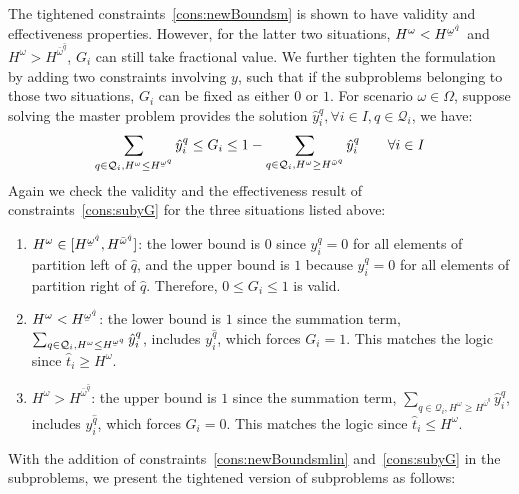 \documentclass[11pt]{article}
\renewcommand{\underbar}{\underaccent{\bar}}
\begin{document}
	The tightened constraints~\eqref{cons:newBoundsm} is shown to have validity and effectiveness properties. However, for the latter two situations, \(H^\omega < H^{\underbar{\omega}^{\hat{q}}}\) and \(H^\omega > H^{\bar{\omega}^{\hat{q}}}\), \(G_i\) can still take fractional value. We further tighten the formulation by adding two constraints involving \(y\), such that if the subproblems belonging to those two situations, \(G_i\) can be fixed as either \(0\) or \(1\). For scenario \(\omega \in \Omega\), suppose solving the master problem provides the solution \(\hat{y}_i^q, \forall i \in I, q \in \mathcal{Q}_i\), we have:
		\begin{equation}\label{cons:subyG}
			\sum_{q \in \mathcal{Q}_i, H^\omega \leq H^{\underbar{\omega}^q}} \hat{y}_i^q \leq G_i \leq 1 - \sum_{q \in \mathcal{Q}_i, H^\omega \geq H^{\bar{\omega}^q}} \hat{y}_i^q \qquad \forall i \in I 
		\end{equation}
	Again we check the validity and the effectiveness result of constraints~\eqref{cons:subyG} for the three situations listed above:
	\begin{enumerate}
		\item 
			\(H^\omega \in [H^{\underbar{\omega}^{\hat{q}}},H^{\bar{\omega}^{\hat{q}}}]\): the lower bound is \(0\) since \(y_i^q = 0\) for all elements of partition left of \(\hat{q}\), and the upper bound is \(1\) because \(y_i^q = 0\) for all elements of partition right of \(\hat{q}\). Therefore, \(0 \leq G_i \leq 1\) is valid.
		\item 
			\(H^\omega < H^{\underbar{\omega}^{\hat{q}}}\): the lower bound is \(1\) since the summation term, \(\sum_{q \in \mathcal{Q}_i, H^\omega \leq H^{\underbar{\omega}^q}} \hat{y}_i^q\), includes \(y_i^{\hat{q}}\), which forces \(G_i = 1\). This matches the logic since \(\hat{t}_i \geq H^\omega\).
		\item 
			\(H^\omega > H^{\bar{\omega}^{\hat{q}}}\): the upper bound is \(1\) since the summation term, \(\sum_{q \in \mathcal{Q}_i, H^\omega \geq H^{\bar{\omega}^q}} \hat{y}_i^q\), includes \(y_i^{\hat{q}}\), which forces \(G_i = 0\). This matches the logic since \(\hat{t}_i \leq H^\omega\).
	\end{enumerate}
	With the addition of constraints~\eqref{cons:newBoundsmlin} and~\eqref{cons:subyG} in the subproblems, we present the tightened version of subproblems as follows: 
\end{document}
